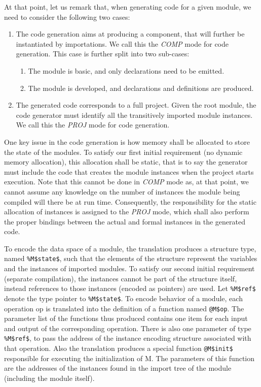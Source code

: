 \documentclass{llncs}
\newcommand{\llvm}[1]{\texttt{#1}}
\newcommand{\B}[1]{\textsf{#1}}
\begin{document}
At that point, let us remark that, when generating code for a given module, we
need to consider the following two cases:
\begin{enumerate}
\item The code generation aims at producing a component, that will further be
  instantiated by importations. We call this the \emph{COMP} mode for code
  generation. This case is further split into two sub-cases:
  \begin{enumerate}
  \item The module is basic, and only declarations need to be emitted.
  \item The module is developed, and declarations and definitions are produced.
  \end{enumerate}
\item The generated code corresponds to a full project. Given the root module,
  the code generator must identify all the transitively imported module instances. We call this the \emph{PROJ} mode for code generation.
\end{enumerate}
One key issue in the code generation is how memory shall be allocated to store
the state of the modules. To satisfy our first initial requirement (no dynamic
memory allocation), this allocation shall be static, that is to say the
generator must include the code that creates the module instances when the
project starts execution. Note that this cannot be done in \emph{COMP} mode as,
at that point, we cannot assume any knowledge on the number of instances the
module being compiled will there be at run time. Consequently, the
responsibility for the static allocation of instances is assigned to the
\emph{PROJ} mode, which shall also perform the proper bindings between the
actual and formal instances in the generated code.

To encode the data space of a module, the translation produces a structure type,
named \llvm{\%M\$state\$}, such that the elements of the structure represent the
variables and the instances of imported modules. To satisfy our second initial
requirement (separate compilation), the instances cannot be part of the
structure itself, instead references to those instances (encoded as pointers)
are used. Let \llvm{\%M\$ref\$} denote the type pointer to \llvm{\%M\$state\$}.
To encode behavior of a module, each operation \B{op} is translated into the
definition of a function named \llvm{@M\$op}. The parameter list of the
functions thus produced contains one item for each input and output of the
corresponding operation. There is also one parameter of type \llvm{\%M\$ref\$},
to pass the address of the instance encoding structure associated with that
operation. Also the translation produces a special function \llvm{@M\$init\$}
responsible for executing the initialization of \B{M}. The parameters of this
function are the addresses of the instances found in the import tree of the
module (including the module itself).
\end{document}

